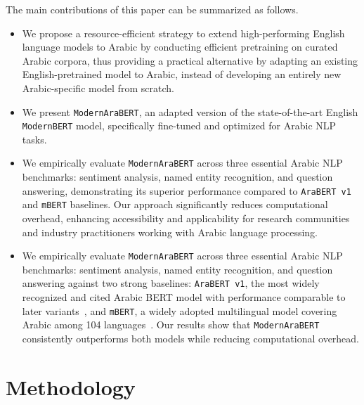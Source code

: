 \documentclass[10pt, a4paper]{article}
\begin{document}
The main contributions of this paper can be summarized as follows.
\begin{itemize}
\item We propose a resource-efficient strategy to extend high-performing English language models to Arabic by conducting efficient pretraining on curated Arabic corpora, thus providing a practical alternative by adapting an existing English-pretrained model to Arabic, instead of developing an entirely new Arabic-specific model from scratch.

\item We present \texttt{ModernAraBERT}, an adapted version of the state-of-the-art English \texttt{ModernBERT} model, specifically fine-tuned and optimized for Arabic NLP tasks.

\item We empirically evaluate \texttt{ModernAraBERT} across three essential Arabic NLP benchmarks: sentiment analysis, named entity recognition, and question answering, demonstrating its superior performance compared to \texttt{AraBERT v1} and \texttt{mBERT} baselines. Our approach significantly reduces computational overhead, enhancing accessibility and applicability for research communities and industry practitioners working with Arabic language processing.

\item We empirically evaluate \texttt{ModernAraBERT} across three essential Arabic NLP benchmarks: sentiment analysis, named entity recognition, and question answering against two strong baselines: \texttt{AraBERT v1}, the most widely recognized and cited Arabic BERT model with performance comparable to later variants~\cite{antoun2020arabert,farha2021benchmarking}, and \texttt{mBERT}, a widely adopted multilingual model covering Arabic among 104 languages~\cite{alammary2022bert}. Our results show that \texttt{ModernAraBERT} consistently outperforms both models while reducing computational overhead.

\end{itemize}



\section{Methodology}
\end{document}
